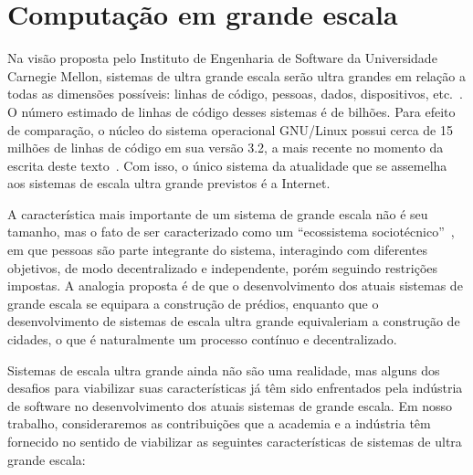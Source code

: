 
\chapter{Computação em grande escala}
\label{cap:escala}

Na visão proposta pelo Instituto de Engenharia de Software da Universidade Carnegie Mellon, sistemas de ultra grande escala serão ultra grandes em relação a todas as dimensões possíveis: linhas de código, pessoas, dados, dispositivos, etc.~\cite{CarnegieMellon2006ULS}. O número estimado de linhas de código desses sistemas é de bilhões. Para efeito de comparação, o núcleo do sistema operacional GNU/Linux possui cerca de 15 milhões de linhas de código em sua versão 3.2, a mais recente no momento da escrita deste texto~\cite{Leemhuis2012Statistics}. Com isso, o único sistema da atualidade que se assemelha aos sistemas de escala ultra grande previstos é a Internet. 

 

A característica mais importante de um sistema de grande escala não é seu tamanho, mas o fato de ser caracterizado como um ``ecossistema sociotécnico''~\cite{CarnegieMellon2006ULS}, em que pessoas são parte integrante do sistema, interagindo com diferentes objetivos, de modo decentralizado e independente, porém seguindo restrições impostas. A analogia proposta é de que o desenvolvimento dos atuais sistemas de grande escala se equipara a construção de prédios, enquanto que o desenvolvimento de sistemas de escala ultra grande equivaleriam a construção de cidades, o que é naturalmente um processo contínuo e decentralizado.

Sistemas de escala ultra grande ainda não são uma realidade, mas alguns dos desafios para viabilizar suas características já têm sido enfrentados pela indústria de software no desenvolvimento dos atuais sistemas de grande escala. Em nosso trabalho, consideraremos as contribuições que a academia e a indústria têm fornecido no sentido de viabilizar as seguintes características de sistemas de ultra grande escala:

